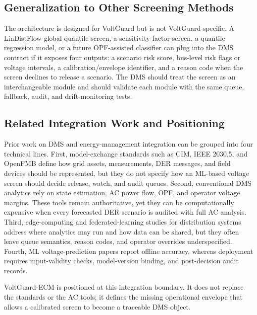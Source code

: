 \documentclass[
  preprint,12pt]{elsarticle}
\begin{document}
\subsection{Generalization to Other Screening
Methods}\label{generalization-to-other-screening-methods}

The architecture is designed for VoltGuard but is not
VoltGuard-specific. A LinDistFlow-global-quantile screen, a
sensitivity-factor screen, a quantile regression model, or a future
OPF-assisted classifier can plug into the DMS contract if it exposes
four outputs: a scenario risk score, bus-level risk flags or voltage
intervals, a calibration/envelope identifier, and a reason code when the
screen declines to release a scenario. The DMS should treat the screen
as an interchangeable module and should validate each module with the
same queue, fallback, audit, and drift-monitoring tests.

\subsection{Related Integration Work and
Positioning}\label{related-integration-work-and-positioning}

Prior work on DMS and energy-management integration can be grouped into
four technical lines. First, model-exchange standards such as CIM, IEEE
2030.5, and OpenFMB define how grid assets, measurements, DER messages,
and field devices should be represented, but they do not specify how an
ML-based voltage screen should decide release, watch, and audit queues.
Second, conventional DMS analytics rely on state estimation, AC power
flow, OPF, and operator voltage margins. These tools remain
authoritative, yet they can be computationally expensive when every
forecasted DER scenario is audited with full AC analysis. Third,
edge-computing and federated-learning studies for distribution systems
address where analytics may run and how data can be shared, but they
often leave queue semantics, reason codes, and operator overrides
underspecified. Fourth, ML voltage-prediction papers report offline
accuracy, whereas deployment requires input-validity checks,
model-version binding, and post-decision audit records.

VoltGuard-ECM is positioned at this integration boundary. It does not
replace the standards or the AC tools; it defines the missing
operational envelope that allows a calibrated screen to become a
traceable DMS object.
\end{document}
